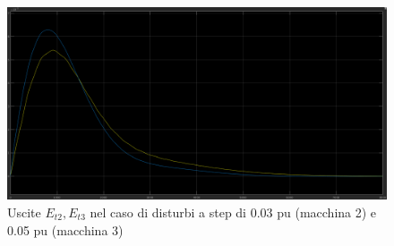 \documentclass[Lau,noexaminfo]{sapthesis}
\begin{document}
	\begin{figure}
	\centering
	\includegraphics[scale=0.33,angle=90]{Simulazione_disturbo}
	\caption{Uscite $E_{t2},E_{t3}$ nel caso di disturbi a step di 0.03 pu (macchina 2) e 0.05 pu (macchina 3)}
	\end{figure}

	\appendix
\end{document}
